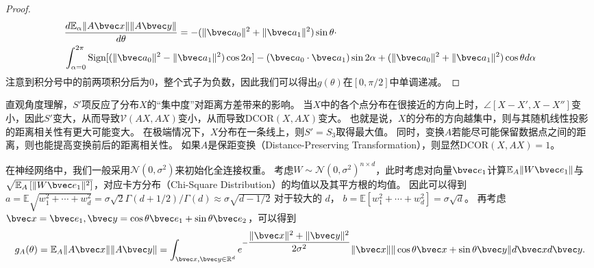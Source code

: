 \begin{proof}
\begin{equation}
        \begin{split}
            & \dfrac{d\mathbb E_\alpha \Vert A\bvec x \Vert \Vert A\bvec y \Vert}{d\theta} = 
            -(\Vert \bvec a_0 \Vert^2 + \Vert \bvec a_1 \Vert^2)\sin \theta \cdot \\
            & \int_{\alpha=0}^{2\pi} 
                \text{Sign}[(\Vert \bvec a_0 \Vert^2 - \Vert\bvec a_1\Vert^2)\cos 2 \alpha] - 
                (\bvec a_0 \cdot \bvec a_1) \sin 2\alpha + 
                (\Vert \bvec a_0 \Vert^2 + \Vert\bvec a_1\Vert^2) \cos \theta d\alpha
        \end{split}
    \end{equation}
    注意到积分号中的前两项积分后为0，整个式子为负数，因此我们可以得出$g(\theta)$在$[0, \pi/2]$中单调递减。
\end{proof}

直观角度理解，$S'$项反应了分布$X$的“集中度”对距离方差带来的影响。
%
当$X$中的各个点分布在很接近的方向上时，$\angle[X - X', X - X'']$变小，因此$S'$变大，从而导致$\mathcal{V}(AX, AX)$变小，从而导致$\text{DCOR}(X, AX)$变大。
%
也就是说，$X$的分布的方向越集中，则与其随机线性投影的距离相关性有更大可能变大。
%
在极端情况下，$X$分布在一条线上，则$S' = S_3$取得最大值。
%
同时，变换$A$若能尽可能保留数据点之间的距离，则也能提高变换前后的距离相关性。
%
如果$A$是保距变换（Distance-Preserving Transformation），则显然$\text{DCOR}(X, AX) = 1$。


%
在神经网络中，我们一般采用$\mathcal N(0, \sigma^2)$来初始化全连接权重。
%
考虑$W \sim \mathcal N(0, \sigma^2)^{n \times d}$，此时考虑对向量$\bvec e_1$计算$\mathbb E_A \Vert W\bvec e_1 \Vert$与$\sqrt{\mathbb E_A \left[\Vert W\bvec e_1 \Vert^2 \right]}$，对应卡方分布（Chi-Square Distribution）的均值以及其平方根的均值。
%
因此可以得到
$a = \mathbb E \sqrt{w_1^2 + \cdots + w_d^2} = \sigma \sqrt{2} \Gamma(d + 1/2) / \Gamma(d) \approx \sigma \sqrt{d - 1/2}$ 对于较大的 $d$，                    
$b = \mathbb E \left[ {w_1^2 + \cdots + w_d^2} \right] = \sigma\sqrt{d}$。
%
再考虑$\bvec x = \bvec e_1, \bvec y = \cos \theta \bvec e_1 + \sin \theta \bvec e_2$，可以得到
\begin{equation}
    g_A(\theta) = \mathbb E_A \Vert A\bvec x \Vert \Vert A \bvec y \Vert = \int_{\bvec x, \bvec y \in \mathbb R^d} e^{-\dfrac{\Vert \bvec x \Vert^2 + \Vert \bvec y \Vert^2}{2\sigma^2}}
\Vert \bvec x \Vert \Vert \cos \theta \bvec x + \sin \theta \bvec y \Vert d\bvec x d\bvec y.
\end{equation}

